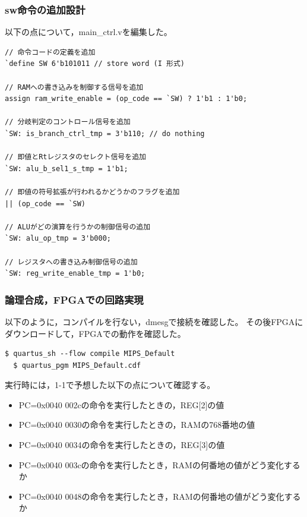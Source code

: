 \subsubsection{sw命令の追加設計}
以下の点について，main\_ctrl.vを編集した。
\begin{lstlisting}[caption={sw命令の追加設計},label={sw命令の追加設計}]
// 命令コードの定義を追加
`define SW 6'b101011 // store word (I 形式)

// RAMへの書き込みを制御する信号を追加
assign ram_write_enable = (op_code == `SW) ? 1'b1 : 1'b0;

// 分岐判定のコントロール信号を追加
`SW: is_branch_ctrl_tmp = 3'b110; // do nothing

// 即値とRtレジスタのセレクト信号を追加
`SW: alu_b_sel1_s_tmp = 1'b1;

// 即値の符号拡張が行われるかどうかのフラグを追加
|| (op_code == `SW)

// ALUがどの演算を行うかの制御信号の追加
`SW: alu_op_tmp = 3'b000;

// レジスタへの書き込み制御信号の追加
`SW: reg_write_enable_tmp = 1'b0;

\end{lstlisting}

\subsubsection{論理合成，FPGAでの回路実現}
以下のように，コンパイルを行ない，dmesgで接続を確認した。
その後FPGAにダウンロードして，FPGAでの動作を確認した。

\begin{lstlisting}[caption={コンパイル，ダウンロード},label={コンパイル，ダウンロード1-2}]
  $ quartus_sh --flow compile MIPS_Default
  $ quartus_pgm MIPS_Default.cdf 
\end{lstlisting}

実行時には，1-1で予想した以下の点について確認する。
\begin{itemize}
  \item PC=0x0040 002cの命令を実行したときの，REG[2]の値
  \item PC=0x0040 0030の命令を実行したときの，RAMの768番地の値
  \item PC=0x0040 0034の命令を実行したときの，REG[3]の値
  \item PC=0x0040 003cの命令を実行したとき，RAMの何番地の値がどう変化するか
  \item PC=0x0040 0048の命令を実行したとき，RAMの何番地の値がどう変化するか
\end{itemize}

